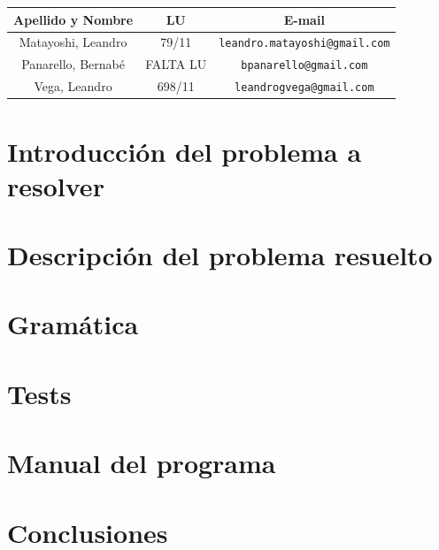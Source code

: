 \documentclass[a4paper, 10pt, twoside]{article}
\begin{document}
\begin{center}
\vspace{0.5cm}

\begin{tabular}{|c|c|c|}
\hline
Apellido y Nombre & LU & E-mail\\
\hline
Matayoshi, Leandro  & 79/11 & {\tt leandro.matayoshi@gmail.com}\\
Panarello, Bernabé  & FALTA LU & {\tt bpanarello@gmail.com}\\
Vega, Leandro    & 698/11 & {\tt leandrogvega@gmail.com}\\
\hline
\end{tabular}

\end{center}

\newpage
{}



\tableofcontents

\newpage



\section{Introducción del problema a resolver}

\newpage

\section{Descripción del problema resuelto}

\newpage

\section{Gramática}

\newpage

\section{Tests}

\newpage

\section{Manual del programa}

\newpage

\section{Conclusiones}

\end{document}
